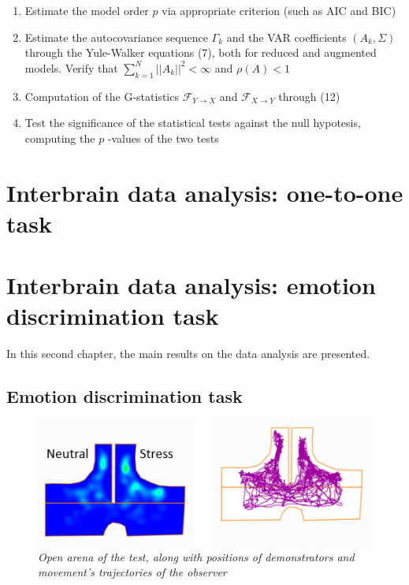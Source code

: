 \documentclass[a4paper]{article}
\begin{document}
\begin{enumerate}
	\item Estimate the model order $p$ via appropriate criterion (such as AIC and BIC)
	
	\item Estimate the autocovariance sequence $\Gamma_k$ and the VAR coefficients $(A_k, \Sigma)$ through the Yule-Walker equations (7), both for reduced and augmented models. Verify that $ \sum_{k=1}^{N}||A_k||^2 < \infty $ and  $\rho(A) < 1$
	
	\item Computation of the G-statistics $ \mathcal{F}_{Y \rightarrow X} $ and $ \mathcal{F}_{X \rightarrow Y} $ through (12)
	
	\item Test the significance of the statistical tests against the null hypotesis, computing the $p$ -values of the two tests 
	
\end{enumerate}

\newpage
\section{Interbrain data analysis: one-to-one task}





\newpage
\section{Interbrain data analysis: emotion discrimination task}

In this second chapter, the main results on the data analysis are presented.


\subsection{Emotion discrimination task}

\begin{figure}[H]
	\begin{center}
		\includegraphics[scale=.90]{arena.png} 
	\end{center} 
	\caption{\textit{Open arena of the test, along with positions of demonstrators and movement's trajectories of the observer}}
	
\end{figure}
\end{document}

